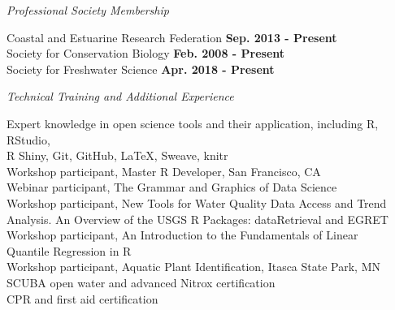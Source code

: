 \documentclass[letterpaper,12pt]{article}
\newcommand{\sectitle}[1]{\vspace{\baselineskip} \centerline{\large{\textit{#1}}}}
\begin{document}
\sectitle{Professional Society Membership}

Coastal and Estuarine Research Federation \hfill {\bf Sep. 2013 - Present} \\
Society for Conservation Biology \hfill {\bf Feb. 2008 - Present} \\
Society for Freshwater Science \hfill {\bf Apr. 2018 - Present}

\sectitle{Technical Training and Additional Experience}

Expert knowledge in open science tools and their application, including R, RStudio, \\
\hspace{0.3in}R Shiny, Git, GitHub, \LaTeX, Sweave, knitr \\
Workshop participant, Master R Developer, San Francisco, CA \\
Webinar participant, The Grammar and Graphics of Data Science \\
Workshop participant, New Tools for Water Quality Data Access and Trend \\ \hspace{0.3in} Analysis. An Overview of the USGS R Packages: dataRetrieval and EGRET\\
Workshop participant, An Introduction to the Fundamentals of Linear \\
\hspace{0.3in}Quantile Regression in R \\
Workshop participant, Aquatic Plant Identification, Itasca State Park, MN \\
SCUBA open water and advanced Nitrox certification \\
CPR and first aid certification
\end{document}
